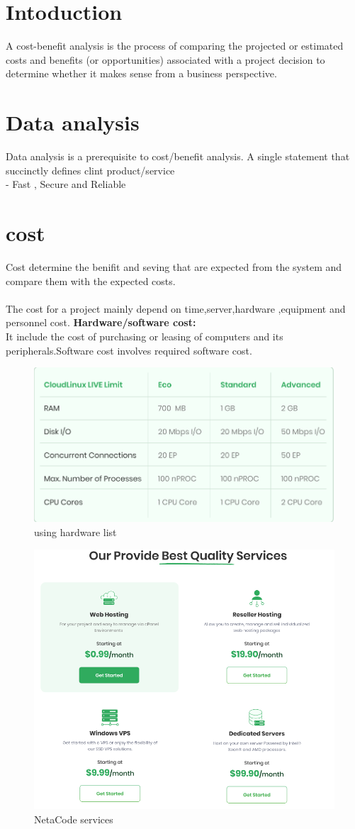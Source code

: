 \documentclass[a4paper,12pt]{report}
\begin{document}
\section{Intoduction}
A cost-benefit analysis is the process of comparing the projected or estimated costs and benefits (or opportunities) associated with a project decision to determine whether it makes sense from a business perspective.\\
\section{Data analysis}
Data analysis is a prerequisite to cost/benefit analysis. A single statement that succinctly defines clint product/service\\
- Fast , Secure and Reliable
\section{cost}
Cost determine the benifit and seving that are expected from the system and compare them with the expected costs.\\
\\The cost for a project mainly depend on time,server,hardware ,equipment and personnel cost.
\subitem \textbf{Hardware/software cost:\\}It include the cost of purchasing or leasing of computers and its peripherals.Software cost involves required software cost.
\newpage
\begin{figure}[h]
	\centering
	\includegraphics[width=0.7\linewidth]{7_2}
	\caption{using hardware list}
	\label{fig:72}
\end{figure}
\begin{figure}[h]
	\centering
	\includegraphics[width=0.8\linewidth]{8_4}
	\caption{NetaCode services}
	\label{fig:84}
\end{figure}
\end{document}
